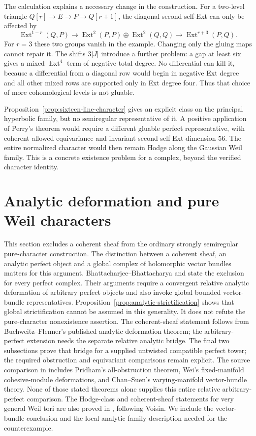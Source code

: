 \documentclass[11pt]{article}
\makeatletter
\providecommand{\compref}[1]{\csname external@#1\endcsname}
\theoremstyle{definition}
\theoremstyle{remark}
\makeatother
\begin{document}
The calculation explains a necessary change in the construction. For a two-level triangle $Q[r]\to E\to P\to Q[r+1]$, the diagonal second self-Ext can only be affected by
\[
 \operatorname{Ext}^{1-r}(Q,P)\longrightarrow
 \operatorname{Ext}^2(P,P)\oplus\operatorname{Ext}^2(Q,Q)
 \longrightarrow\operatorname{Ext}^{r+3}(P,Q).
\]
For $r=3$ these two groups vanish in the example. Changing only the gluing maps cannot repair it. The shifts $3|J|$ introduce a further problem: a gap at least six gives a mixed $\operatorname{Ext}^4$ term of negative total degree. No differential can kill it, because a differential from a diagonal row would begin in negative Ext degree and all other mixed rows are supported only in Ext degree four. Thus that choice of more cohomological levels is not gluable.

Proposition~\ref{prop:sixteen-line-character} gives an explicit class on the principal hyperbolic family, but no semiregular representative of it. A positive application of Perry's theorem would require a different gluable perfect representative, with coherent allowed equivariance and invariant second self-Ext dimension $56$. The entire normalized character would then remain Hodge along the Gaussian Weil family. This is a concrete existence problem for a complex, beyond the verified character identity.
\section{Analytic deformation and pure Weil characters}
\label{sec:analytic-weil-sheaves}

This section excludes a coherent sheaf from the ordinary strongly
semiregular pure-character construction.  The distinction between a
coherent sheaf, an analytic perfect object and a global complex of
holomorphic vector bundles matters for this argument.
Bhattacharjee--Bhattacharya \cite[Theorem~A7]{BBK3Sixfolds} and
\cite[Theorem~10]{BBSecantObjects} state the exclusion for every
perfect complex.  Their arguments require a convergent relative analytic deformation
of arbitrary perfect objects and also invoke global bounded
vector-bundle representatives. Proposition~\ref{prop:analytic-strictification}
shows that global strictification cannot be assumed in this generality.
It does not refute the pure-character nonexistence assertion.
The coherent-sheaf statement follows from Buchweitz--Flenner's
published analytic deformation theorem; the arbitrary-perfect
extension needs the separate relative analytic bridge. The final two subsections
prove that bridge for a supplied untwisted compatible perfect tower;
the required obstruction and equivariant comparisons remain explicit.
The source comparison in \cite[Section~\compref{sec:pure-weil-complexes}]{CompanionA}
includes Pridham's all-obstruction theorem, Wei's fixed-manifold
cohesive-module deformations, and Chan--Suen's varying-manifold
vector-bundle theory. None of those stated theorems alone supplies
this entire relative arbitrary-perfect comparison.
The Hodge-class and coherent-sheaf statements for very general
Weil tori are also proved in \cite[Lemmas~2--3 and Proposition~2]{BBSecantObjects},
following Voisin.  We include the vector-bundle conclusion and
the local analytic family description needed for the counterexample.
\end{document}
